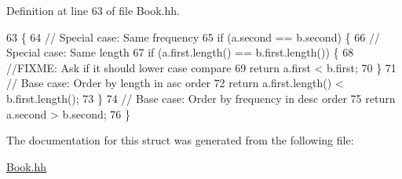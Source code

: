 Definition at line 63 of file Book.\+hh.


\begin{DoxyCode}
63                                                                                 \{
64             \textcolor{comment}{// Special case: Same frequency}
65             \textcolor{keywordflow}{if} (a.second == b.second) \{
66                 \textcolor{comment}{// Special case: Same length}
67                 \textcolor{keywordflow}{if} (a.first.length() == b.first.length()) \{
68                     \textcolor{comment}{//FIXME: Ask if it should lower case compare}
69                     \textcolor{keywordflow}{return} a.first < b.first;
70                 \}
71                 \textcolor{comment}{// Base case: Order by length in asc order}
72                 \textcolor{keywordflow}{return} a.first.length() < b.first.length();
73             \}
74             \textcolor{comment}{// Base case: Order by frequency in desc order}
75             \textcolor{keywordflow}{return} a.second > b.second;
76         \}
\end{DoxyCode}


The documentation for this struct was generated from the following file\+:\begin{DoxyCompactItemize}
\item 
\hyperlink{_book_8hh}{Book.\+hh}\end{DoxyCompactItemize}
